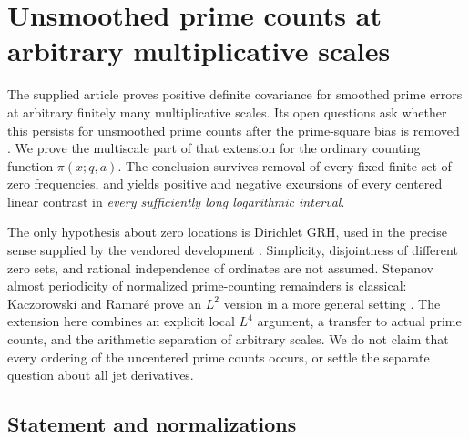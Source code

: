 \section{Unsmoothed prime counts at arbitrary multiplicative scales}
\label{sec:pf}

The supplied article proves positive definite covariance for smoothed prime
errors at arbitrary finitely many multiplicative scales.  Its open questions
ask whether this persists for unsmoothed prime counts after the prime-square
bias is removed \cite[Section~\textup{``Zeros, Euler products and prime races''},
open question~10]{ProveItArticle}.  We prove the multiscale part of that
extension for the ordinary counting function $\pi(x;q,a)$.  The conclusion
survives removal of every fixed finite set of zero frequencies, and yields
positive and negative excursions of every centered linear contrast in
\emph{every sufficiently long logarithmic interval}.

The only hypothesis about zero locations is Dirichlet GRH, used in the precise
sense supplied by the vendored development \cite{ProveItVendor}.  Simplicity,
disjointness of different zero sets, and rational independence of ordinates
are not assumed.  Stepanov almost periodicity of normalized prime-counting
remainders is classical: Kaczorowski and Ramar\'e prove an $L^2$ version in a
more general setting \cite[Theorem~1(e)]{KaczorowskiRamare2003}.  The extension
here combines an explicit local $L^4$ argument, a transfer to actual prime
counts, and the arithmetic separation of arbitrary scales.  We do not claim
that every ordering of the uncentered prime counts occurs, or settle the
separate question about all jet derivatives.

\subsection{Statement and normalizations}
\label{subsec:pf-statement}


